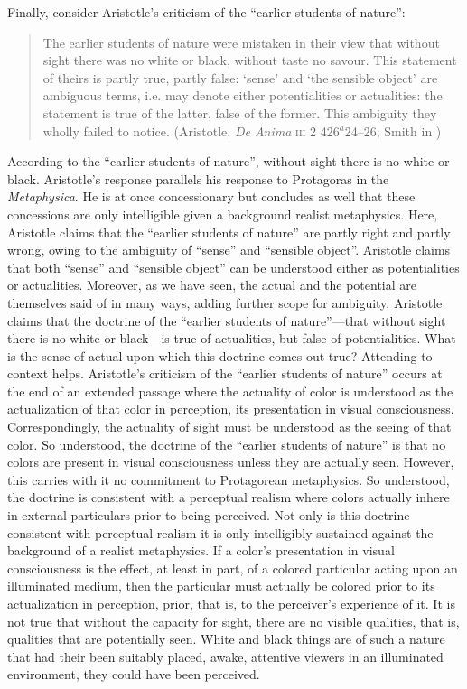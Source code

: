 Finally, consider Aristotle's criticism of the ``earlier students of nature'':
\begin{quote}
	The earlier students of nature were mistaken in their view that without sight there was no white or black, without taste no savour. This statement of theirs is partly true, partly false: ‘sense’ and ‘the sensible object’ are ambiguous terms, i.e. may denote either potentialities or actualities: the statement is true of the latter, false of the former. This ambiguity they wholly failed to notice. (Aristotle, \emph{De Anima} \textsc{iii} 2 426\( ^{a} \)24--26; Smith in \citealt[46--47]{Barnes:1984uq})
\end{quote}
According to the ``earlier students of nature'', without sight there is no white or black. Aristotle's response parallels his response to Protagoras in the \emph{Metaphysica}. He is at once concessionary but concludes as well that these concessions are only intelligible given a background realist metaphysics. Here, Aristotle claims that the ``earlier students of nature'' are partly right and partly wrong, owing to the ambiguity of ``sense'' and ``sensible object''. Aristotle claims that both ``sense'' and ``sensible object'' can be understood either as potentialities or actualities. Moreover, as we have seen, the actual and the potential are themselves said of in many ways, adding further scope for ambiguity. Aristotle claims that the doctrine of the ``earlier students of nature''---that without sight there is no white or black---is true of actualities, but false of potentialities. What is the sense of actual upon which this doctrine comes out true? Attending to context helps. Aristotle's criticism of the ``earlier students of nature'' occurs at the end of an extended passage where the actuality of color is understood as the actualization of that color in perception, its presentation in visual consciousness. Correspondingly, the actuality of sight must be understood as the seeing of that color. So understood, the doctrine of the ``earlier students of nature'' is that no colors are present in visual consciousness unless they are actually seen. However, this carries with it no commitment to Protagorean metaphysics. So understood, the doctrine is consistent with a perceptual realism where colors actually inhere in external particulars prior to being perceived. Not only is this doctrine consistent with perceptual realism it is only intelligibly sustained against the background of a realist metaphysics. If a color's presentation in visual consciousness is the effect, at least in part, of a colored particular acting upon an illuminated medium, then the particular must actually be colored prior to its actualization in perception, prior, that is, to the perceiver's experience of it. It is not true that without the capacity for sight, there are no visible qualities, that is, qualities that are potentially seen. White and black things are of such a nature that had their been suitably placed, awake, attentive viewers in an illuminated environment, they could have been perceived.

